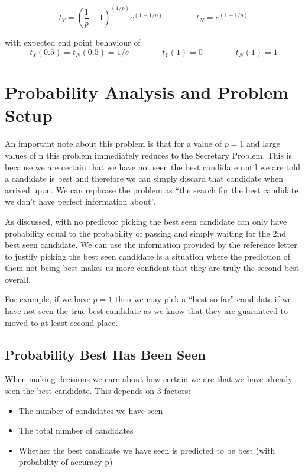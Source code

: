 \documentclass[a4paper,11pt]{article}
\begin{document}
$$
t_Y = \left(\frac{1}{p}-1\right)^{(1/p)}e^{\left(1-1/p\right)} \hspace{4em} t_N = e^{\left(1-1/p\right)}
$$

with expected end point behaviour of 
$$
t_Y(0.5)= t_N(0.5)= 1/e \hspace{4em} t_Y(1) = 0  \hspace{4em} t_N(1) = 1
$$



\section{Probability Analysis and Problem Setup}

An important note about this problem is that for a value of $p = 1$ and large values of n this problem immediately reduces to the Secretary Problem. This is because we are certain that we have not seen the best candidate until we are told a candidate is best and therefore we can simply discard that candidate when arrived upon. We can rephrase the problem as ``the search for the best candidate we don't have perfect information about''.

As discussed, with no predictor picking the best seen candidate can only have probability equal to the probability of passing and simply waiting for the 2nd best seen candidate. We can use the information provided by the reference letter to justify picking the best seen candidate is a situation where the prediction of them not being best makes us more confident that they are truly the second best overall.

For example, if we have $p = 1$ then we may pick a ``best so far'' candidate if we have not seen the true best candidate as we know that they are guaranteed to moved to at least second place.

\subsection{Probability Best Has Been Seen}

When making decisions we care about how certain we are that we have already seen the best candidate. This depends on 3 factors:
\begin{itemize}
\item The number of candidates we have seen
\item The total number of candidates
\item Whether the best candidate we have seen is predicted to be best (with probability of accuracy p)
\end{itemize}
\end{document}

